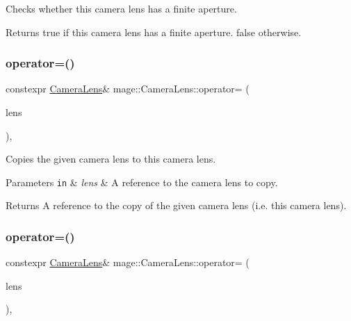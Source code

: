 Checks whether this camera lens has a finite aperture.

\begin{DoxyReturn}{Returns}
{\ttfamily true} if this camera lens has a finite aperture. {\ttfamily false} otherwise. 
\end{DoxyReturn}
\hypertarget{classmage_1_1_camera_lens_ab3b12ac3b0f70df2d949e0ee03cad44f}{}\label{classmage_1_1_camera_lens_ab3b12ac3b0f70df2d949e0ee03cad44f} 
\subsubsection{\texorpdfstring{operator=()}{operator=()}\hspace{0.1cm}{\footnotesize\ttfamily [1/2]}}
{\footnotesize\ttfamily constexpr \hyperlink{classmage_1_1_camera_lens}{Camera\+Lens}\& mage\+::\+Camera\+Lens\+::operator= (\begin{DoxyParamCaption}\item[{const \hyperlink{classmage_1_1_camera_lens}{Camera\+Lens} \&}]{lens }\end{DoxyParamCaption})\hspace{0.3cm}{\ttfamily [default]}, {\ttfamily [noexcept]}}

Copies the given camera lens to this camera lens.


\begin{DoxyParams}[1]{Parameters}
\mbox{\tt in}  & {\em lens} & A reference to the camera lens to copy. \\
\hline
\end{DoxyParams}
\begin{DoxyReturn}{Returns}
A reference to the copy of the given camera lens (i.\+e. this camera lens). 
\end{DoxyReturn}
\hypertarget{classmage_1_1_camera_lens_a330a1e63f29d661362235dc9e3aa3c87}{}\label{classmage_1_1_camera_lens_a330a1e63f29d661362235dc9e3aa3c87} 
\subsubsection{\texorpdfstring{operator=()}{operator=()}\hspace{0.1cm}{\footnotesize\ttfamily [2/2]}}
{\footnotesize\ttfamily constexpr \hyperlink{classmage_1_1_camera_lens}{Camera\+Lens}\& mage\+::\+Camera\+Lens\+::operator= (\begin{DoxyParamCaption}\item[{\hyperlink{classmage_1_1_camera_lens}{Camera\+Lens} \&\&}]{lens }\end{DoxyParamCaption})\hspace{0.3cm}{\ttfamily [default]}, {\ttfamily [noexcept]}}


